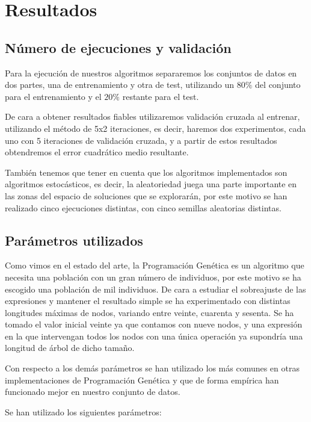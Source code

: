 \section{Resultados}

\subsection{Número de ejecuciones y validación}

Para la ejecución de nuestros algoritmos separaremos los conjuntos de datos en dos partes, una de entrenamiento y otra de test, utilizando un $80\%$ del conjunto para el entrenamiento y el $20\%$ restante para el test.

De cara a obtener resultados fiables utilizaremos validación cruzada al entrenar, utilizando el método de 5x2 iteraciones, es decir, haremos dos experimentos, cada uno con 5 iteraciones de validación cruzada, y a partir de estos resultados obtendremos el error cuadrático medio resultante.

También tenemos que tener en cuenta que los algoritmos implementados son algoritmos estocásticos, es decir, la aleatoriedad juega una parte importante en las zonas del espacio de soluciones que se explorarán, por este motivo se han realizado cinco ejecuciones distintas, con cinco semillas aleatorias distintas.

\subsection{Parámetros utilizados}

Como vimos en el estado del arte, la Programación Genética es un algoritmo que necesita una población con un gran número de individuos, por este motivo se ha escogido una población de mil individuos. De cara a estudiar el sobreajuste de las expresiones y mantener el resultado simple se ha experimentado con distintas longitudes máximas de nodos, variando entre veinte, cuarenta y sesenta. Se ha tomado el valor inicial veinte ya que contamos con nueve nodos, y una expresión en la que intervengan todos los nodos con una única operación ya supondría una longitud de árbol de dicho tamaño.

Con respecto a los demás parámetros se han utilizado los más comunes en otras implementaciones de Programación Genética y que de forma empírica han funcionado mejor en nuestro conjunto de datos.

Se han utilizado los siguientes parámetros:

